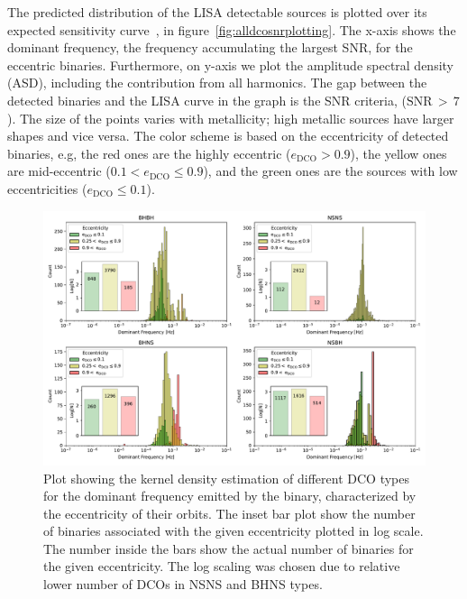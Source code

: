 \documentclass[journal, twocolumn]{IEEEtran}
\newcommand{\ecc}[1]{e_\text{#1}}
\begin{document}
    The predicted distribution of the LISA detectable sources is plotted over its expected sensitivity curve~\cite{Robson2019}, in figure~\ref{fig:alldcosnrplotting}.
    The x-axis shows the dominant frequency, the frequency accumulating the largest SNR, for the eccentric binaries.
    Furthermore, on y-axis we plot the amplitude spectral density (ASD), including the contribution from all harmonics.
    The gap between the detected binaries and the LISA curve in the graph is the SNR criteria, ($\text{SNR}\,>\,7$).
    The size of the points varies with metallicity; high metallic sources have larger shapes and vice versa.
    The color scheme is based on the eccentricity of detected binaries, e.g, the red ones are the highly eccentric ($\ecc{DCO} > 0.9$), the yellow ones are mid-eccentric ($0.1 < \ecc{DCO} \leq 0.9$), and the green ones are the sources with low eccentricities ($\ecc{DCO} \leq 0.1$).
	
    \begin{figure}[!h]
    	\centering
    	\includegraphics[width=\textwidth]{analysis_data/dco_fdom_ecc_details}
    	\caption{Plot showing the kernel density estimation of different DCO types for the dominant frequency emitted by the binary, characterized by the eccentricity of their orbits. The inset bar plot show the number of binaries associated with the given eccentricity plotted in log scale. The number inside the bars show the actual number of binaries for the given eccentricity. The log scaling was chosen due to relative lower number of DCOs in NSNS and BHNS types.}
    	\label{fig:dcofdomeccdetails}
    \end{figure}
\end{document}
